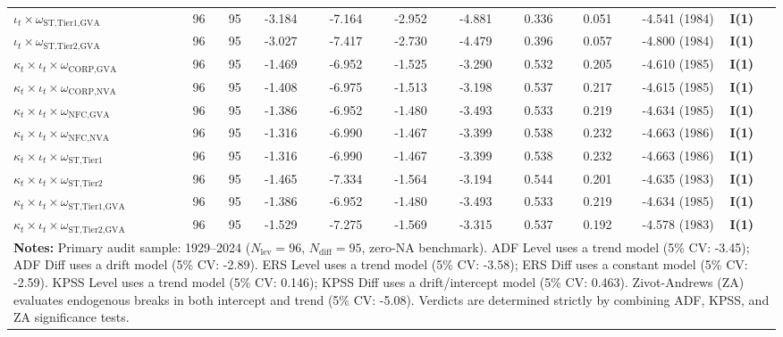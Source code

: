 \documentclass[11pt,a4paper]{article}
\begin{document}
\begin{landscape}
\begin{table}[h!]
\begin{tabular}{p{6.0cm} p{0.6cm} p{0.6cm} p{1.5cm} p{1.5cm} p{1.5cm} p{1.5cm} p{1.5cm} p{1.5cm} p{2.2cm} p{2.2cm}}
$\iota_t \times \omega_{\text{ST,Tier1,GVA}}$ & 96 & 95 & -3.184 & -7.164 & -2.952 & -4.881 & 0.336 & 0.051 & -4.541 (1984) & \textbf{I(1)} \\
$\iota_t \times \omega_{\text{ST,Tier2,GVA}}$ & 96 & 95 & -3.027 & -7.417 & -2.730 & -4.479 & 0.396 & 0.057 & -4.800 (1984) & \textbf{I(1)} \\
$\kappa_t \times \iota_t \times \omega_{\text{CORP,GVA}}$ & 96 & 95 & -1.469 & -6.952 & -1.525 & -3.290 & 0.532 & 0.205 & -4.610 (1985) & \textbf{I(1)} \\
$\kappa_t \times \iota_t \times \omega_{\text{CORP,NVA}}$ & 96 & 95 & -1.408 & -6.975 & -1.513 & -3.198 & 0.537 & 0.217 & -4.615 (1985) & \textbf{I(1)} \\
$\kappa_t \times \iota_t \times \omega_{\text{NFC,GVA}}$ & 96 & 95 & -1.386 & -6.952 & -1.480 & -3.493 & 0.533 & 0.219 & -4.634 (1985) & \textbf{I(1)} \\
$\kappa_t \times \iota_t \times \omega_{\text{NFC,NVA}}$ & 96 & 95 & -1.316 & -6.990 & -1.467 & -3.399 & 0.538 & 0.232 & -4.663 (1986) & \textbf{I(1)} \\
$\kappa_t \times \iota_t \times \omega_{\text{ST,Tier1}}$ & 96 & 95 & -1.316 & -6.990 & -1.467 & -3.399 & 0.538 & 0.232 & -4.663 (1986) & \textbf{I(1)} \\
$\kappa_t \times \iota_t \times \omega_{\text{ST,Tier2}}$ & 96 & 95 & -1.465 & -7.334 & -1.564 & -3.194 & 0.544 & 0.201 & -4.635 (1983) & \textbf{I(1)} \\
$\kappa_t \times \iota_t \times \omega_{\text{ST,Tier1,GVA}}$ & 96 & 95 & -1.386 & -6.952 & -1.480 & -3.493 & 0.533 & 0.219 & -4.634 (1985) & \textbf{I(1)} \\
$\kappa_t \times \iota_t \times \omega_{\text{ST,Tier2,GVA}}$ & 96 & 95 & -1.529 & -7.275 & -1.569 & -3.315 & 0.537 & 0.192 & -4.578 (1983) & \textbf{I(1)} \\
\bottomrule
\multicolumn{11}{p{23.0cm}}{\footnotesize \textbf{Notes:} Primary audit sample: 1929--2024 ($N_{\text{lev}}=96$, $N_{\text{diff}}=95$, zero-NA benchmark). ADF Level uses a trend model (5\% CV: -3.45); ADF Diff uses a drift model (5\% CV: -2.89). ERS Level uses a trend model (5\% CV: -3.58); ERS Diff uses a constant model (5\% CV: -2.59). KPSS Level uses a trend model (5\% CV: 0.146); KPSS Diff uses a drift/intercept model (5\% CV: 0.463). Zivot-Andrews (ZA) evaluates endogenous breaks in both intercept and trend (5\% CV: -5.08). Verdicts are determined strictly by combining ADF, KPSS, and ZA significance tests.}
\end{tabular}
\end{table}
\end{landscape}
\end{document}
